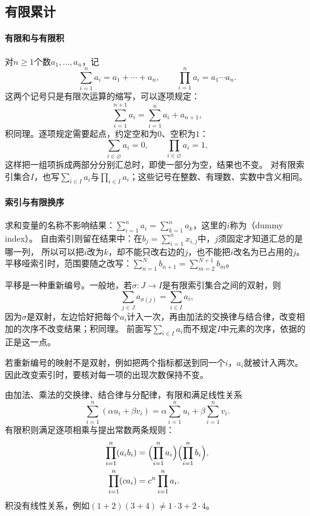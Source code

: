 \subsection{有限累计}
\label{sec:prelim-finite-sums-products}

\paragraph{有限和与有限积}
对$n\geq1$个数$a_1,\ldots,a_n$，记
\[
 \sum_{i=1}^{n}a_i=a_1+\cdots+a_n,\qquad \prod_{i=1}^{n}a_i=a_1\cdots a_n.
\]
这两个记号只是有限次运算的缩写，可以逐项规定：
\[
 \sum_{i=1}^{n+1}a_i=\sum_{i=1}^na_i+a_{n+1},
\]
积同理。逐项规定需要起点，约定空和为$0$、空积为$1$：
\[
 \sum_{i\in\varnothing}a_i=0,\qquad \prod_{i\in\varnothing}a_i=1,
\]
这样把一组项拆成两部分分别汇总时，即使一部分为空，结果也不变。
对有限索引集合$I$，也写$\sum_{i\in I}a_i$与$\prod_{i\in I}a_i$；这些记号在整数、有理数、实数中含义相同。

\paragraph{索引与有限换序}
求和变量的名称不影响结果：$\sum_{i=1}^na_i=\sum_{k=1}^na_k$，这里的$i$称为（dummy index）。
自由索引则留在结果中：在$b_j=\sum_{i=1}^{n}x_{i,j}$中，$j$须固定才知道汇总的是哪一列，
所以可以把$i$改为$k$，却不能只改右边的$j$，也不能把$i$改名为已占用的$j$。
平移哑索引时，范围要随之改写：$\sum_{n=1}^{N}b_{n+1}=\sum_{m=2}^{N+1}b_m$。

平移是一种重新编号。一般地，若$\sigma:J\to I$是有限索引集合之间的双射，则
\begin{equation}
 \sum_{j\in J}a_{\sigma(j)}=\sum_{i\in I}a_i,
 \label{eq:prelim-reindexing-sum}
\end{equation}
因为$\sigma$是双射，左边恰好把每个$a_i$计入一次，再由加法的交换律与结合律，改变相加的次序不改变结果；积同理。
前面写$\sum_{i\in I}a_i$而不规定$I$中元素的次序，依据的正是这一点。

若重新编号的映射不是双射，例如把两个指标都送到同一个$i$，$a_i$就被计入两次。因此改变索引时，要核对每一项的出现次数保持不变。

由加法、乘法的交换律、结合律与分配律，有限和满足线性关系
\begin{equation}
 \sum_{i=1}^{n}(\alpha u_i+\beta v_i)=\alpha\sum_{i=1}^{n}u_i+\beta\sum_{i=1}^{n}v_i.
 \label{eq:prelim-sum-linearity}
\end{equation}
有限积则满足逐项相乘与提出常数两条规则：
\[
 \begin{aligned}
  \prod_{i=1}^n(a_ib_i)&=\Bigl(\prod_{i=1}^na_i\Bigr)\Bigl(\prod_{i=1}^nb_i\Bigr),\\
  \prod_{i=1}^n(ca_i)&=c^n\prod_{i=1}^na_i.
 \end{aligned}
\]
积没有线性关系，例如$(1+2)(3+4)\neq1\cdot3+2\cdot4$。


